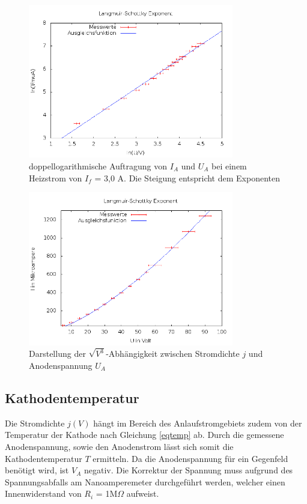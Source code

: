 \begin{figure}[H]
\includegraphics[width=0.8\textwidth]{pics/504b2.png} 
\caption{doppellogarithmische Auftragung von $I_A$ und $U_A$ bei einem Heizstrom von $I_f$ = 3,0 A. Die Steigung entspricht dem Exponenten}
\label{piclang}
\end{figure}
\begin{figure}[H]
 \includegraphics[width=0.8\textwidth]{pics/504b1.png} 
 \caption{Darstellung der $\sqrt{V^3}$-Abhängigkeit zwischen Stromdichte $j$ und Anodenspannung $U_A$}
\end{figure}

\subsection{Kathodentemperatur}
\label{kath}
Die Stromdichte $j(V)$ hängt im Bereich des Anlaufstromgebiets zudem von der Temperatur der Kathode nach Gleichung \eqref{eqtemp} ab.
Durch die gemessene Anodenspannung, sowie den Anodenstrom lässt sich somit die Kathodentemperatur $T$ ermitteln. Da die Anodenspannung
für ein Gegenfeld benötigt wird, ist $V_A$ negativ. Die Korrektur der Spannung muss aufgrund des Spannungsabfalls am Nanoamperemeter
durchgeführt werden, welcher einen Innenwiderstand von $R_i$ = 1M$\Omega$ aufweist.

